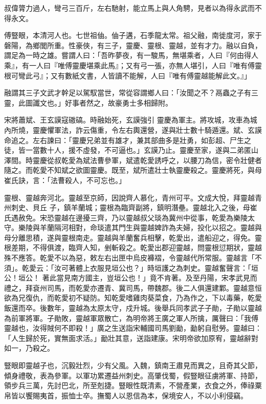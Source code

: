 \begin{pinyinscope}
 叔偉膂力過人，彎弓三百斤，左右馳射，能立馬上與人角騁，見者以為得永武而不得永文。



 傅豎眼，本清河人也。七世祖伷。伷子遘，石季龍太常。祖父融，南徙度河，家于磐陽，為鄉閭所重。性豪俠，有三子，靈慶、靈根、靈越，並有才力。融以自負，謂足為一時之雄。嘗謂人曰：「吾昨夢夜，有一駿馬，無堪乘者，人曰『何由得人乘』，有一人曰『唯傅靈慶堪乘此馬』；又有弓一張，亦無人堪引，人曰『唯有傅靈根可彎此弓』；又有數紙文書，人皆讀不能解，人曰『唯有傅靈越能解此文。』」



 融謂其三子文武才幹足以駕馭當世，常從容謂鄉人曰：「汝聞之不？鬲蟲之子有三靈，此圖讖文也。」好事者然之，故豪勇士多相歸附。



 宋將蕭斌、王玄謨寇磝碻。時融始死，玄謨強引
 靈慶為軍主。將攻城，攻車為城內所燒，靈慶懼軍法，詐云傷重，令左右輿還營，遂與壯士數十騎遁還。斌、玄謨命追之。左右諫曰：「靈慶兄弟並有雄才，兼其部曲多是壯勇，如彭超、尸生之徒，皆一當數十人，援不虛發，不可逼也。」玄謨乃止。靈慶至家，遂與二弟匿山澤間。時靈慶從叔乾愛為斌法曹參軍，斌遣乾愛誘呼之，以腰刀為信，密令壯健者隨之。而乾愛不知斌之欲圖靈慶。既至，斌所遣壯士執靈慶殺之。靈慶將死，與母崔氏訣，言：「法曹殺人，不可忘也。」



 靈根、靈越奔河北。靈越至京師，因說齊人慕化，青州可平。文成大悅，拜靈越青州刺史、貝丘
 子，鎮羊蘭城；靈根為臨齊副將，鎮明潛壘。靈越北入之後，母崔氏遇赦免。宋恐靈越在邊擾三齊，乃以靈越叔父琰為冀州中從事，乾愛為樂陵太守。樂陵與羊蘭隔河相對，命琰遣其門生與靈越婢詐為夫婦，投化以招之。靈越與母分離思積，遂與靈根南走。靈越與羊蘭奮兵相擊，乾愛出，遣船迎之，得免。靈根差期，不得俱渡，臨齊人知，剉斬殺之。乾愛出郡迎靈越，問靈根愆期狀，靈越殊不應答。乾愛不以為惡，敕左右出匣中烏皮褲褶，令靈越代所常服。靈越言「不須」。乾愛云：「汝可著體上衣服見垣公也？」時垣護之為刺史。靈越奮聲言：「垣公！垣公！
 著此當見南方國主，豈垣公也！」竟不肯著。及至丹陽，宋孝武見而禮之，拜袞州司馬，而乾愛亦遷青、冀司馬，帶魏郡。後二人俱還建鄴。靈越意恒欲為兄復仇，而乾愛初不疑防。知乾愛嗜雞肉葵菜食，乃為作之，下以毒藥，乾愛飯還而卒。後數年，靈越為太原太守，戍升城。後舉兵同孝武子子勛，子勛以靈越為前軍將軍。子勛敗，靈越軍眾散亡，為明帝將王廣之軍人所擒，厲聲曰：「我傅靈越也，汝得賊何不即殺！」廣之生送詣宋輔國司馬劉勔，勔躬自慰勞。靈越曰：「人生歸於死，實無面求活。」勔壯其意，送詣建康。宋明帝欲加原宥，靈越辭對如一，乃殺之。



 豎眼即靈越子也，沉毅壯烈，少有父風。入魏，鎮南王肅見而異之，且奇其父節，傾身禮敬，表為參軍。以軍功累遷益州刺史。高肇伐蜀，假豎眼征虜將軍、持節，領步兵三萬，先討巴北，所至剋捷。豎眼性既清素，不營產業，衣食之外，俸祿粟帛皆以饗賜夷首，振恤士卒。撫蜀人以恩信為本，保境安人，不以小利侵竊。




\end{pinyinscope}
